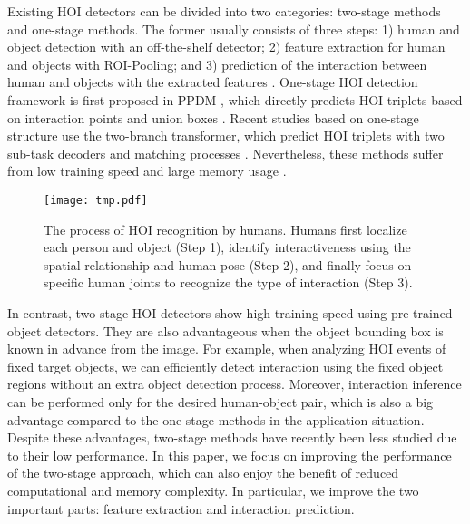 \documentclass[10pt,twocolumn,letterpaper]{article}
\begin{document}
Existing HOI detectors can be divided into two categories: two-stage methods and one-stage methods. The former usually consists of three steps: 1) human and object detection with an off-the-shelf detector; 2) feature extraction for human and objects with ROI-Pooling; and 3) prediction of the interaction between human and objects with the extracted features \cite{chao:wacv2018, gao2018ican, gupta2019no,  wan2019pose, hou2021affordance, hou2020visual}.  One-stage HOI detection framework is first proposed in PPDM \cite{liao2020ppdm}, which directly predicts HOI triplets based on interaction points \cite{wang2020learning, liao2020ppdm} and union boxes \cite{kim2020uniondet}. Recent studies based on one-stage structure use the two-branch transformer, which predict HOI triplets with two sub-task decoders and matching processes \cite{liao2022gen, zhou2022human}. Nevertheless, these methods suffer from low training speed and large memory usage \cite{zhang2022efficient, zhu2020deformable}. 



\begin{figure*}[t]
\begin{center}

\texttt{[image: tmp.pdf]}

\end{center}
\vspace{-5mm}
   \caption{The process of HOI recognition by humans. Humans first localize each person and object (Step 1), identify interactiveness using the spatial relationship and human pose (Step 2), and finally focus on specific human joints to recognize the type of interaction (Step 3). 
}
\vspace{-1mm}
\label{fig:human_perception}
\end{figure*} 

In contrast, two-stage HOI detectors show high training speed using pre-trained object detectors. They are also advantageous when the object bounding box is known in advance from the image. For example, when analyzing HOI events of fixed target objects, we can efficiently detect interaction
using the fixed object regions without an extra object detection process. Moreover, interaction inference can be performed only for the desired human-object pair, which is also a big advantage compared to the one-stage methods in the application situation. Despite these advantages, two-stage methods have recently been less studied due to their low performance. In this paper, we focus on improving the performance of the two-stage approach, which can also enjoy the benefit of reduced computational and memory complexity. In particular, we improve the two important parts: feature extraction and interaction prediction.
\end{document}
